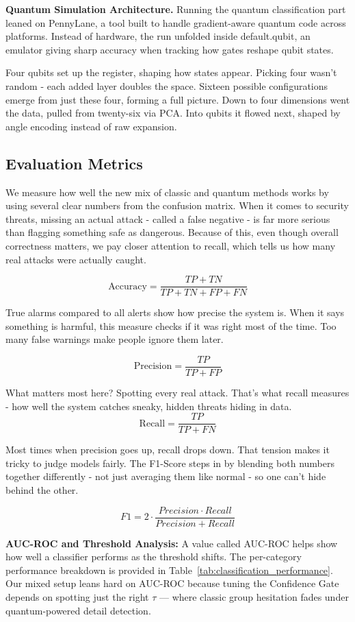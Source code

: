 \documentclass[journal,onecolumn]{IEEEtran}
\begin{document}
\textbf{Quantum Simulation Architecture.}
Running the quantum classification part leaned on PennyLane, a tool built to handle gradient-aware quantum code across platforms. Instead of hardware, the run unfolded inside default.qubit, an emulator giving sharp accuracy when tracking how gates reshape qubit states.

Four qubits set up the register, shaping how states appear. Picking four wasn't random - each added layer doubles the space. Sixteen possible configurations emerge from just these four, forming a full picture. Down to four dimensions went the data, pulled from twenty-six via PCA. Into qubits it flowed next, shaped by angle encoding instead of raw expansion.

\subsection{Evaluation Metrics}
We measure how well the new mix of classic and quantum methods works by using several clear numbers from the confusion matrix. When it comes to security threats, missing an actual attack - called a false negative - is far more serious than flagging something safe as dangerous. Because of this, even though overall correctness matters, we pay closer attention to recall, which tells us how many real attacks were actually caught.

$$
\text{Accuracy} = \frac{TP + TN}{TP + TN + FP + FN}
$$

True alarms compared to all alerts show how precise the system is. When it says something is harmful, this measure checks if it was right most of the time. Too many false warnings make people ignore them later.

$$
\text{Precision} = \frac{TP}{TP + FP}
$$

What matters most here? Spotting every real attack. That's what recall measures - how well the system catches sneaky, hidden threats hiding in data.
$$
\text{Recall} = \frac{TP}{TP + FN}
$$

Most times when precision goes up, recall drops down. That tension makes it tricky to judge models fairly. The F1-Score steps in by blending both numbers together differently - not just averaging them like normal - so one can't hide behind the other.

$$F1 = 2 \cdot \frac{Precision \cdot Recall}{Precision + Recall}$$

\textbf{AUC-ROC and Threshold Analysis:}
A value called AUC-ROC helps show how well a classifier performs as the threshold shifts. The per-category performance breakdown is provided in Table~\ref{tab:classification_performance}. Our mixed setup leans hard on AUC-ROC because tuning the Confidence Gate depends on spotting just the right $\tau$ --- where classic group hesitation fades under quantum-powered detail detection.
\end{document}
